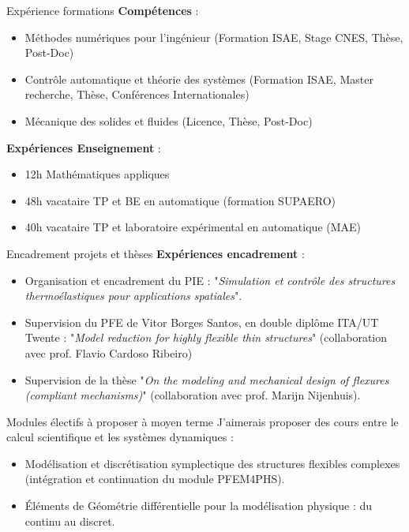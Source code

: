\documentclass[aspectratio=169, french]{beamer}
\begin{document}
\begin{frame}{Expérience formations }
	\textbf{Compétences} : 
	\begin{itemize}
		\item Méthodes numériques pour l'ingénieur (Formation ISAE, Stage CNES, Thèse, Post-Doc)
		\item Contrôle automatique et théorie des systèmes (Formation ISAE, Master recherche, Thèse, Conférences Internationales)
		\item Mécanique des solides et fluides (Licence, Thèse, Post-Doc) 
	\end{itemize}
\vspace{.5cm}
\textbf{Expériences Enseignement} : 
\begin{itemize}
	\item 12h Mathématiques appliques
	\item 48h vacataire TP et BE en automatique (formation SUPAERO) 
	\item 40h vacataire TP et laboratoire expérimental en automatique (MAE)
\end{itemize}
\end{frame}

\begin{frame}{Encadrement projets et thèses}
	\textbf{Expériences encadrement} : 
	\begin{itemize}
		\item Organisation et encadrement du PIE : "\textit{Simulation et contrôle des structures thermoélastiques pour applications spatiales}".
		\item Supervision du PFE de Vitor Borges Santos, en double diplôme ITA/UT Twente : "\textit{Model reduction for highly flexible thin structures}" (collaboration avec prof. Flavio Cardoso Ribeiro)
		\item Supervision de la thèse "\textit{On the modeling and mechanical design of flexures (compliant mechanisms)}" (collaboration avec prof. Marijn Nijenhuis).
	\end{itemize}

\end{frame}


\begin{frame}{Modules électifs à proposer à moyen terme}
	J'aimerais proposer des cours entre le calcul scientifique et les systèmes dynamiques :
	\begin{itemize}
		\item Modélisation et discrétisation symplectique des structures flexibles complexes (intégration et continuation du module PFEM4PHS).
		\item Éléments de Géométrie différentielle pour la modélisation physique : du continu au discret.
	\end{itemize}
\end{frame}
\end{document}
